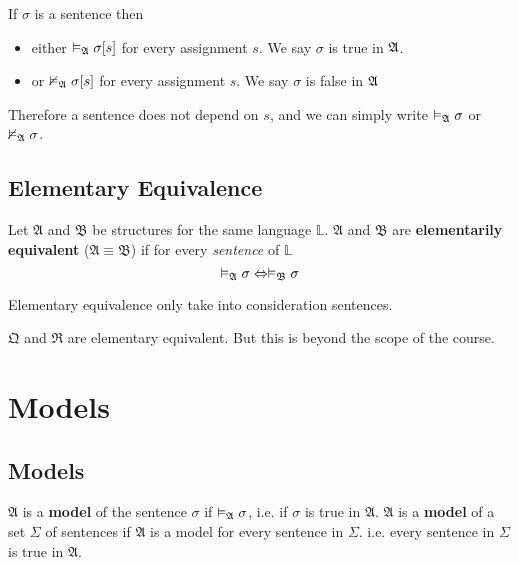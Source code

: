 \begin{corollary}
    If $\sigma$ is a sentence then
    \begin{itemize}
        \item either $\vDash_{\mathfrak{A}}\sigma[s]$ for every assignment $s$. We say $\sigma$ is true in $\mathfrak{A}$.
        \item or $\nvDash_{\mathfrak{A}}\sigma[s]$ for every assignment $s$. We say $\sigma$ is false in $\mathfrak{A}$
    \end{itemize}
\end{corollary}

Therefore a sentence does not depend on $s$, and we can simply write $\vDash_{\mathfrak{A}}\sigma$ or $\nvDash_{\mathfrak{A}}\sigma$.

\subsection{Elementary Equivalence}

\begin{definition}
    Let $\mathfrak{A}$ and $\mathfrak{B}$ be structures for the same language $\mathbb{L}$. $\mathfrak{A}$ and $\mathfrak{B}$ are \textbf{elementarily equivalent} ($\mathfrak{A} \equiv \mathfrak{B}$) if for every \emph{sentence} of $\mathbb{L}$
    \[ \vDash_{\mathfrak{A}}\sigma \Leftrightarrow \vDash_{\mathfrak{B}}\sigma \]
\end{definition}

\begin{remark}
    Elementary equivalence only take into consideration sentences.
\end{remark}

\begin{proposition}
    $\mathfrak{Q}$ and $\mathfrak{R}$ are elementary equivalent. But this is beyond the scope of the course.
\end{proposition}

\section{Models}

\subsection{Models}

\begin{definition}[Model]
    $\mathfrak{A}$ is a \textbf{model} of the sentence $\sigma$ if $\vDash_{\mathfrak{A}}\sigma$, i.e. if $\sigma$ is true in $\mathfrak{A}$. $\mathfrak{A}$ is a \textbf{model} of a set $\Sigma$ of sentences if $\mathfrak{A}$ is a model for every sentence in $\Sigma$. i.e. every sentence in $\Sigma$ is true in $\mathfrak{A}$.
\end{definition}

